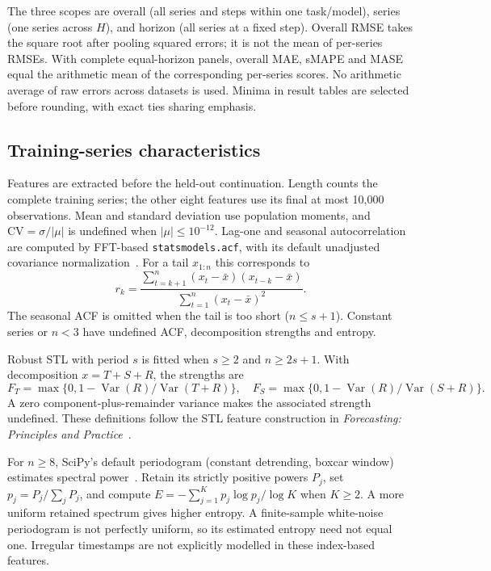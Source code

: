 The three scopes are overall (all series and steps within one task/model), series (one series across $H$), and horizon (all series at a fixed step). Overall RMSE takes the square root after pooling squared errors; it is not the mean of per-series RMSEs. With complete equal-horizon panels, overall MAE, sMAPE and MASE equal the arithmetic mean of the corresponding per-series scores. No arithmetic average of raw errors across datasets is used. Minima in result tables are selected before rounding, with exact ties sharing emphasis.

\subsection{Training-series characteristics}\label{sec:characteristics}
Features are extracted before the held-out continuation. Length counts the complete training series; the other eight features use its final at most 10,000 observations. Mean and standard deviation use population moments, and $\mathrm{CV}=\sigma/|\mu|$ is undefined when $|\mu|\leq10^{-12}$. Lag-one and seasonal autocorrelation are computed by FFT-based \texttt{statsmodels.acf}, with its default unadjusted covariance normalization~\cite{acf_docs}. For a tail $x_{1:n}$ this corresponds to
\[
 r_k=\frac{\sum_{t=k+1}^{n}(x_t-\bar x)(x_{t-k}-\bar x)}{\sum_{t=1}^{n}(x_t-\bar x)^2}.
\]
The seasonal ACF is omitted when the tail is too short ($n\leq s+1$). Constant series or $n<3$ have undefined ACF, decomposition strengths and entropy.

Robust STL with period $s$ is fitted when $s\geq2$ and $n\geq2s+1$. With decomposition $x=T+S+R$, the strengths are
\[
 F_T=\max\{0,1-\operatorname{Var}(R)/\operatorname{Var}(T+R)\},\quad
 F_S=\max\{0,1-\operatorname{Var}(R)/\operatorname{Var}(S+R)\}.
\]
A zero component-plus-remainder variance makes the associated strength undefined. These definitions follow the STL feature construction in \emph{Forecasting: Principles and Practice}~\cite{stl_features}.

For $n\geq8$, SciPy's default periodogram (constant detrending, boxcar window) estimates spectral power~\cite{periodogram_docs}. Retain its strictly positive powers $P_j$, set $p_j=P_j/\sum_jP_j$, and compute $E=-\sum_{j=1}^{K}p_j\log p_j/\log K$ when $K\geq2$. A more uniform retained spectrum gives higher entropy. A finite-sample white-noise periodogram is not perfectly uniform, so its estimated entropy need not equal one. Irregular timestamps are not explicitly modelled in these index-based features.

